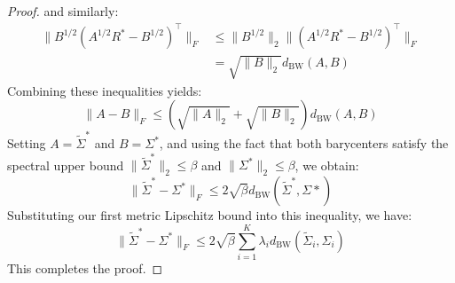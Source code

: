 \documentclass{article}
\theoremstyle{plain}
\theoremstyle{definition}
\theoremstyle{remark}
\begin{document}
\begin{proof}
and similarly:
\begin{align}
  \| B^{1/2} (A^{1/2} R^* - B^{1/2})^\top \|_F &\le \| B^{1/2} \|_2 \| (A^{1/2} R^* - B^{1/2})^\top \|_F \\
  &= \sqrt{\|B\|_2} d_{\text{BW}}(A, B)
\end{align}
Combining these inequalities yields:
\begin{equation}
  \| A - B \|_F \le \left( \sqrt{\|A\|_2} + \sqrt{\|B\|_2} \right) d_{\text{BW}}(A, B)
\end{equation}
Setting $A = \tilde{\Sigma}^*$ and $B = \Sigma^*$, and using the fact that both barycenters satisfy the spectral upper bound $\|\tilde{\Sigma}^*\|_2 \le \beta$ and $\|\Sigma^*\|_2 \le \beta$, we obtain:
\begin{equation}
  \| \tilde{\Sigma}^* - \Sigma^* \|_F \le 2 \sqrt{\beta} d_{\text{BW}}(\tilde{\Sigma}^*, \Sigma*)
\end{equation}
Substituting our first metric Lipschitz bound into this inequality, we have:
\begin{equation}
  \| \tilde{\Sigma}^* - \Sigma^* \|_F \le 2 \sqrt{\beta} \sum_{i=1}^K \lambda_i d_{\text{BW}}(\tilde{\Sigma}_i, \Sigma_i)
\end{equation}
This completes the proof.
\end{proof}
\end{document}
